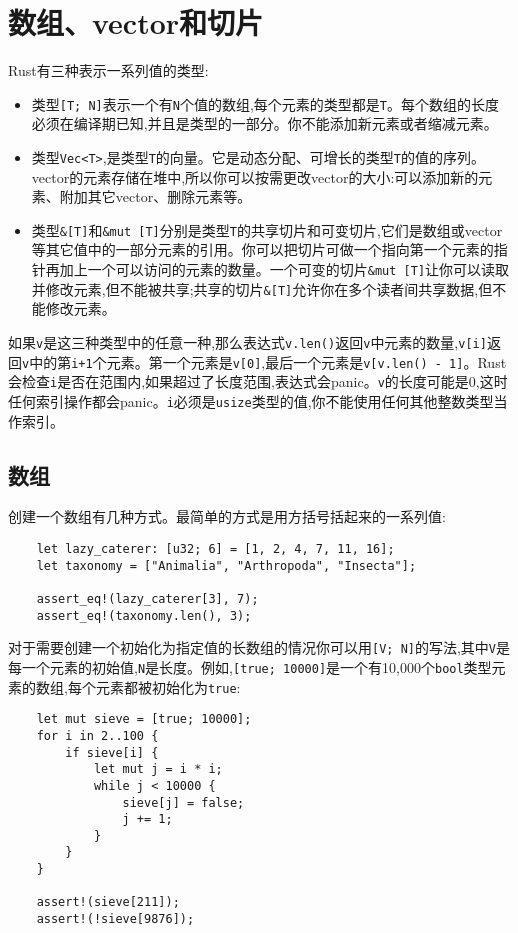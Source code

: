 \section{数组、vector和切片}
Rust有三种表示一系列值的类型:
\begin{itemize}
    \item 类型\texttt{[T; N]}表示一个有\texttt{N}个值的数组,每个元素的类型都是\texttt{T}。每个数组的长度必须在编译期已知,并且是类型的一部分。你不能添加新元素或者缩减元素。
    \item 类型\texttt{Vec<T>},是类型\texttt{T}的向量。它是动态分配、可增长的类型\texttt{T}的值的序列。vector的元素存储在堆中,所以你可以按需更改vector的大小:可以添加新的元素、附加其它vector、删除元素等。
    \item 类型\texttt{\&[T]}和\texttt{\&mut [T]}分别是类型\texttt{T}的共享切片和可变切片,它们是数组或vector等其它值中的一部分元素的引用。你可以把切片可做一个指向第一个元素的指针再加上一个可以访问的元素的数量。一个可变的切片\texttt{\&mut [T]}让你可以读取并修改元素,但不能被共享;共享的切片\texttt{\&[T]}允许你在多个读者间共享数据,但不能修改元素。
\end{itemize}

如果\texttt{v}是这三种类型中的任意一种,那么表达式\texttt{v.len()}返回\texttt{v}中元素的数量,\texttt{v[i]}返回\texttt{v}中的第\texttt{i+1}个元素。第一个元素是\texttt{v[0]},最后一个元素是\texttt{v[v.len() - 1]}。Rust会检查\texttt{i}是否在范围内,如果超过了长度范围,表达式会panic。\texttt{v}的长度可能是0,这时任何索引操作都会panic。\texttt{i}必须是\texttt{usize}类型的值,你不能使用任何其他整数类型当作索引。

\subsection{数组}
创建一个数组有几种方式。最简单的方式是用方括号括起来的一系列值:
\begin{verbatim}
    let lazy_caterer: [u32; 6] = [1, 2, 4, 7, 11, 16];
    let taxonomy = ["Animalia", "Arthropoda", "Insecta"];

    assert_eq!(lazy_caterer[3], 7);
    assert_eq!(taxonomy.len(), 3);
\end{verbatim}

对于需要创建一个初始化为指定值的长数组的情况你可以用\texttt{[V; N]}的写法,其中\texttt{V}是每一个元素的初始值,\texttt{N}是长度。例如,\texttt{[true; 10000]}是一个有10,000个\texttt{bool}类型元素的数组,每个元素都被初始化为\texttt{true}:
\begin{verbatim}
    let mut sieve = [true; 10000];
    for i in 2..100 {
        if sieve[i] {
            let mut j = i * i;
            while j < 10000 {
                sieve[j] = false;
                j += 1;
            }
        }
    }

    assert!(sieve[211]);
    assert!(!sieve[9876]);
\end{verbatim}

